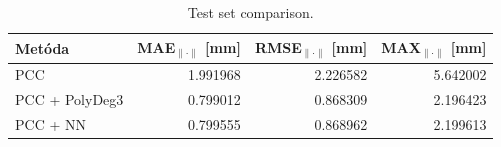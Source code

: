 \begin{table}[h!]
\centering
\caption{Test set comparison.}
\label{tab:phase3_test_comparison}
\begin{tabular}{lrrr}
\toprule
Metóda & MAE$_{\|\cdot\|}$ [mm] & RMSE$_{\|\cdot\|}$ [mm] & MAX$_{\|\cdot\|}$ [mm] \\
\midrule
PCC & 1.991968 & 2.226582 & 5.642002 \\
PCC + PolyDeg3 & 0.799012 & 0.868309 & 2.196423 \\
PCC + NN & 0.799555 & 0.868962 & 2.199613 \\
\bottomrule
\end{tabular}
\end{table}